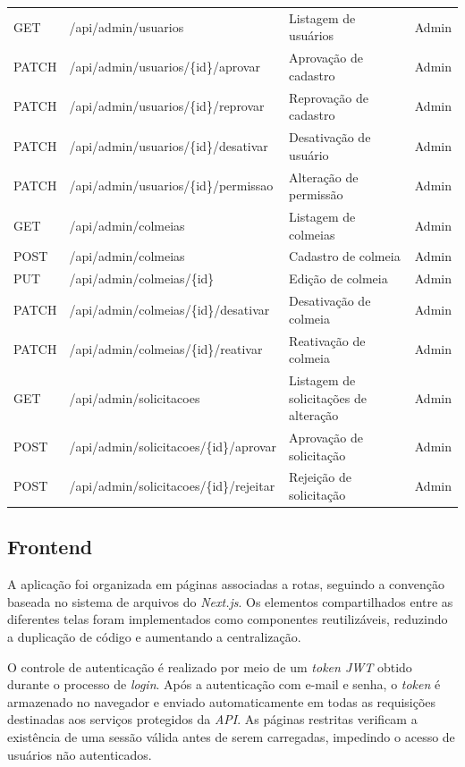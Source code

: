 \documentclass[12pt]{unisenaiclass}
\begin{document}
\begin{longtable}{llp{5cm}l}
\hline
GET   & /api/admin/usuarios                        & Listagem de usuários & Admin \\
PATCH & /api/admin/usuarios/\{id\}/aprovar          & Aprovação de cadastro & Admin \\
PATCH & /api/admin/usuarios/\{id\}/reprovar         & Reprovação de cadastro & Admin \\
PATCH & /api/admin/usuarios/\{id\}/desativar        & Desativação de usuário & Admin \\
PATCH & /api/admin/usuarios/\{id\}/permissao        & Alteração de permissão & Admin \\
GET   & /api/admin/colmeias                        & Listagem de colmeias & Admin \\
POST  & /api/admin/colmeias                        & Cadastro de colmeia & Admin \\
PUT   & /api/admin/colmeias/\{id\}                  & Edição de colmeia & Admin \\
PATCH & /api/admin/colmeias/\{id\}/desativar        & Desativação de colmeia & Admin \\
PATCH & /api/admin/colmeias/\{id\}/reativar         & Reativação de colmeia & Admin \\
GET   & /api/admin/solicitacoes                    & Listagem de solicitações de alteração & Admin \\
POST  & /api/admin/solicitacoes/\{id\}/aprovar      & Aprovação de solicitação & Admin \\
POST  & /api/admin/solicitacoes/\{id\}/rejeitar     & Rejeição de solicitação & Admin \\
\hline
\end{longtable}

\subsection{Frontend}

A aplicação foi organizada em páginas associadas a rotas, seguindo a convenção baseada no sistema de arquivos do \textit{Next.js}. Os elementos compartilhados entre as diferentes telas foram implementados como componentes reutilizáveis, reduzindo a duplicação de código e aumentando a centralização.

O controle de autenticação é realizado por meio de um \textit{token JWT} obtido durante o processo de \textit{login}. Após a autenticação com e-mail e senha, o \textit{token} é armazenado no navegador e enviado automaticamente em todas as requisições destinadas aos serviços protegidos da \textit{API}. As páginas restritas verificam a existência de uma sessão válida antes de serem carregadas, impedindo o acesso de usuários não autenticados.
\end{document}
